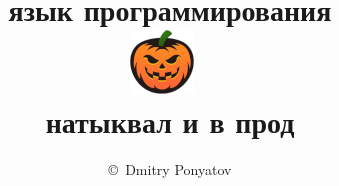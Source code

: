 
\title{\ \\язык программирования\\\includegraphics[height=1.5\baselineskip]{../vscode/logo.png}\ {\Huge\textbf{\T}}\\натыквал и в прод}
\author{\copyright\ Dmitry Ponyatov }

\maketitle
\tableofcontents





